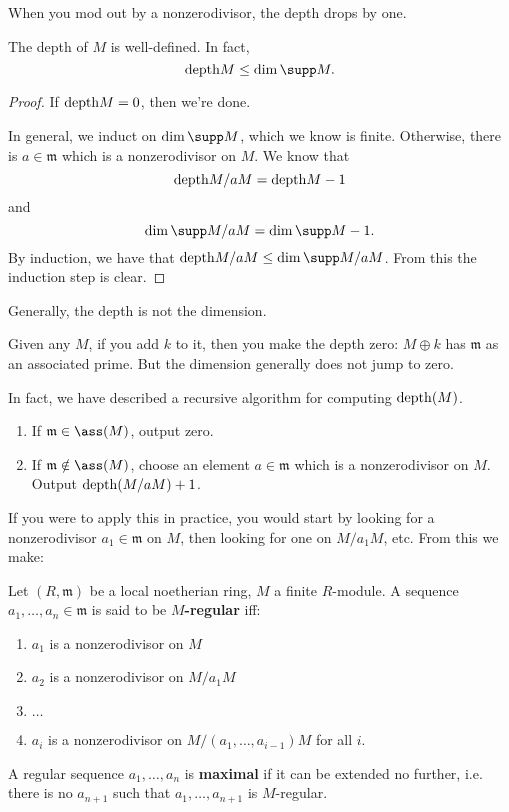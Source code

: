When you mod out by a nonzerodivisor, the depth drops by one.

\begin{corollary} 
The depth of $M$ is well-defined. In fact, 
\[ \depth M \leq \dim \supp M.  \]
\end{corollary} 
\begin{proof} 
If $\mathrm{depth} M = 0$, then we're done.

In general, we induct on $\dim \supp M$, which we know is finite. Otherwise,
there is $ a \in \mathfrak{m}$ which is a nonzerodivisor on $M$. We know that
\[ \mathrm{depth} M/aM = \mathrm{depth} M -1  \]
and
\[ \dim \supp M/aM = \dim \supp M -1.  \]
By induction, we have that $\depth M/aM \leq \dim \supp M/aM$. From this the
induction step is clear.
\end{proof} 

Generally, the depth is not the dimension.
\begin{example} 
Given any $M$, if you add $k$ to it, then you make the depth zero: $M \oplus k$
has $\mathfrak{m}$ as an associated prime. But the dimension generally does not
jump to zero.
\end{example}

In fact, we have described a recursive algorithm for computing $\mathrm{depth}(M)$.
\begin{enumerate}
\item If $\mathfrak{m}  \in \ass(M)$, output zero.
\item If $\mathfrak{m} \notin \ass(M)$, choose an element $a \in \mathfrak{m}$
which is a nonzerodivisor on $M$. Output $\mathrm{depth}(M/aM) +1$.
\end{enumerate}


If you were to apply this in practice, you would start by looking for a
nonzerodivisor $a_1 \in \mathfrak{m}$ on $M$, then looking for one on $M/a_1
M$, etc.
From this we make:

\begin{definition} 
Let $(R, \mathfrak{m})$ be a local noetherian ring, $M$ a finite $R$-module. A
sequence $a_1, \dots, a_n \in \mathfrak{m}$ is said to be \textbf{$M$-regular} iff:
\begin{enumerate}
\item $a_1$ is a nonzerodivisor on $M$ 
\item $a_2$ is a nonzerodivisor on $M/a_1 M$
\item  $\dots$
\item  $a_i$ is a nonzerodivisor on $M/(a_1, \dots, a_{i-1})M$ for all $i$.
\end{enumerate}
A regular sequence $a_1, \dots, a_n$ is \textbf{maximal } if it can be extended
no further, i.e. there is no $a_{n+1}$ such that $a_1, \dots, a_{n+1}$ is
$M$-regular.
\end{definition} 

